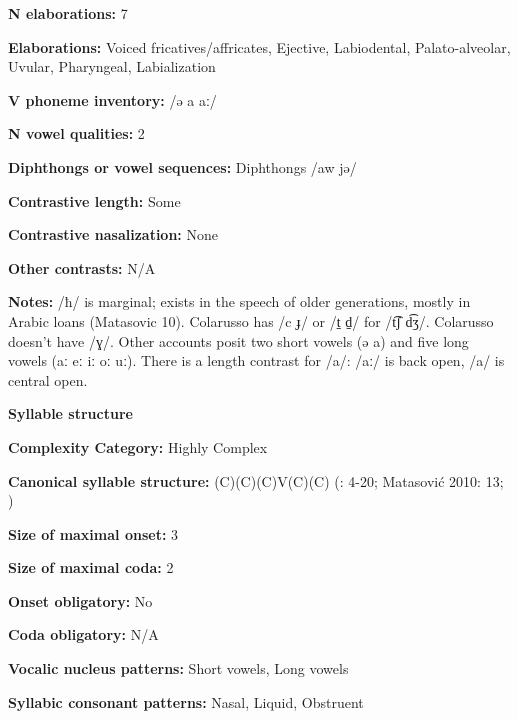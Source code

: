 \textbf{N elaborations:} 7



\textbf{Elaborations:} Voiced fricatives/affricates, Ejective, Labiodental, Palato-alveolar, Uvular, Pharyngeal, Labialization



\textbf{V phoneme inventory:} /ə a aː/



\textbf{N vowel qualities:} 2



\textbf{Diphthongs or vowel sequences:} Diphthongs /aw jə/



\textbf{Contrastive length:} Some



\textbf{Contrastive nasalization:} None



\textbf{Other contrasts:} N/A



\textbf{Notes:} /ħ/ is marginal; exists in the speech of older generations, mostly in Arabic loans (Matasovic 10). Colarusso has /c ɟ/ or /t̠ d̠/ for /t͡ʃ d͡ʒ/. Colarusso doesn’t have /ɣ/. Other accounts posit two short vowels (ə a) and five long vowels (aː eː iː oː uː). There is a length contrast for /a/: /aː/ is back open, /a/ is central open.



\textbf{Syllable structure}



\textbf{Complexity Category:} Highly Complex



\textbf{Canonical syllable structure:} (C)(C)(C)V(C)(C) (\citealt{Colarusso2006}: 4-20; Matasović 2010: 13; \citealt{Applebaum2013})



\textbf{Size of maximal onset:} 3



\textbf{Size of maximal coda:} 2



\textbf{Onset obligatory:} No



\textbf{Coda obligatory:} N/A



\textbf{Vocalic nucleus patterns:} Short vowels, Long vowels



\textbf{Syllabic consonant patterns:} Nasal, Liquid, Obstruent



